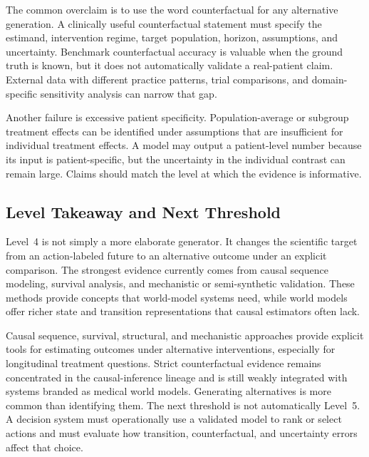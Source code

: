 The common overclaim is to use the word counterfactual for any alternative generation. A clinically useful counterfactual statement must specify the estimand, intervention regime, target population, horizon, assumptions, and uncertainty. Benchmark counterfactual accuracy is valuable when the ground truth is known, but it does not automatically validate a real-patient claim. External data with different practice patterns, trial comparisons, and domain-specific sensitivity analysis can narrow that gap.

Another failure is excessive patient specificity. Population-average or subgroup treatment effects can be identified under assumptions that are insufficient for individual treatment effects. A model may output a patient-level number because its input is patient-specific, but the uncertainty in the individual contrast can remain large. Claims should match the level at which the evidence is informative.

\subsection{Level Takeaway and Next Threshold}

Level~4 is not simply a more elaborate generator. It changes the scientific target from an action-labeled future to an alternative outcome under an explicit comparison. The strongest evidence currently comes from causal sequence modeling, survival analysis, and mechanistic or semi-synthetic validation. These methods provide concepts that world-model systems need, while world models offer richer state and transition representations that causal estimators often lack.

\levelsummary
{Causal sequence, survival, structural, and mechanistic approaches provide explicit tools for estimating outcomes under alternative interventions, especially for longitudinal treatment questions.}
{Strict counterfactual evidence remains concentrated in the causal-inference lineage and is still weakly integrated with systems branded as medical world models. Generating alternatives is more common than identifying them.}
{The next threshold is not automatically Level~5. A decision system must operationally use a validated model to rank or select actions and must evaluate how transition, counterfactual, and uncertainty errors affect that choice.}
